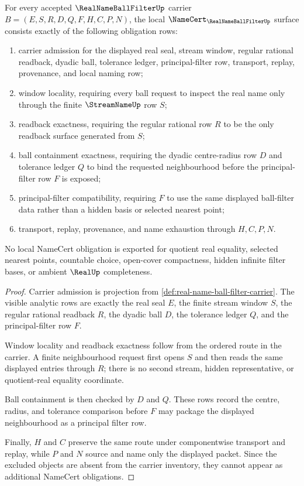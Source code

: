 \begin{theorem}
\label{thm:real-name-ball-filter-namecert-obligations}
For every accepted $\RealNameBallFilterUp$ carrier $B=(E,S,R,D,Q,F,H,C,P,N)$, the local $\NameCert_{\RealNameBallFilterUp}$ surface consists exactly of the following obligation rows:
\begin{enumerate}
\item carrier admission for the displayed real seal, stream window, regular rational readback, dyadic ball, tolerance ledger, principal-filter row, transport, replay, provenance, and local naming row;
\item window locality, requiring every ball request to inspect the real name only through the finite $\StreamNameUp$ row $S$;
\item readback exactness, requiring the regular rational row $R$ to be the only readback surface generated from $S$;
\item ball containment exactness, requiring the dyadic centre-radius row $D$ and tolerance ledger $Q$ to bind the requested neighbourhood before the principal-filter row $F$ is exposed;
\item principal-filter compatibility, requiring $F$ to use the same displayed ball-filter data rather than a hidden basis or selected nearest point;
\item transport, replay, provenance, and name exhaustion through $H,C,P,N$.
\end{enumerate}
No local NameCert obligation is exported for quotient real equality, selected nearest points, countable choice, open-cover compactness, hidden infinite filter bases, or ambient $\RealUp$ completeness.
\end{theorem}
\begin{proof}
Carrier admission is projection from \autoref{def:real-name-ball-filter-carrier}. The visible analytic rows are exactly the real seal $E$, the finite stream window $S$, the regular rational readback $R$, the dyadic ball $D$, the tolerance ledger $Q$, and the principal-filter row $F$.

Window locality and readback exactness follow from the ordered route in the carrier. A finite neighbourhood request first opens $S$ and then reads the same displayed entries through $R$; there is no second stream, hidden representative, or quotient-real equality coordinate.

Ball containment is then checked by $D$ and $Q$. These rows record the centre, radius, and tolerance comparison before $F$ may package the displayed neighbourhood as a principal filter row.

Finally, $H$ and $C$ preserve the same route under componentwise transport and replay, while $P$ and $N$ source and name only the displayed packet. Since the excluded objects are absent from the carrier inventory, they cannot appear as additional NameCert obligations.
\end{proof}

